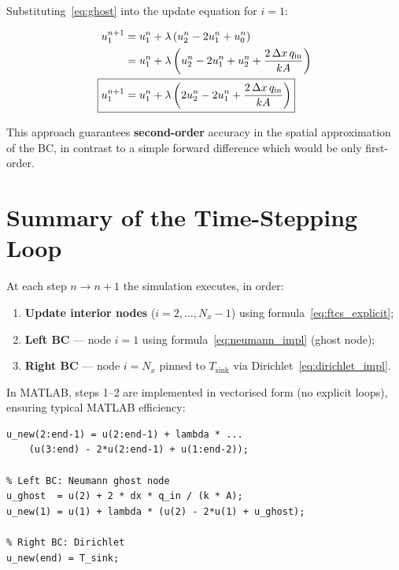 \documentclass[11pt, a4paper]{scrartcl}
\begin{document}
\begin{onehalfspace}
Substituting~\eqref{eq:ghost} into the update equation for $i=1$:

\begin{align}
  u_1^{n+1} &= u_1^n + \lambda \left( u_2^n - 2u_1^n + u_0^n \right) \notag\\
             &= u_1^n + \lambda \left( u_2^n - 2u_1^n + u_2^n + \frac{2\,\Delta x\, q_\text{in}}{k A} \right) \notag\\
  \Aboxed{u_1^{n+1} &= u_1^n + \lambda \left( 2u_2^n - 2u_1^n + \frac{2\,\Delta x\, q_\text{in}}{k A} \right)}
  \label{eq:neumann_impl}
\end{align}

This approach guarantees \textbf{second-order} accuracy in the spatial approximation of the BC, in contrast to a simple forward difference which would be only first-order.

\section{Summary of the Time-Stepping Loop}

At each step $n \to n+1$ the simulation executes, in order:

\begin{enumerate}
  \item \textbf{Update interior nodes} ($i = 2, \ldots, N_x-1$) using formula~\eqref{eq:ftcs_explicit};
  \item \textbf{Left BC} — node $i=1$ using formula~\eqref{eq:neumann_impl} (ghost node);
  \item \textbf{Right BC} — node $i=N_x$ pinned to $T_\text{sink}$ via Dirichlet~\eqref{eq:dirichlet_impl}.
\end{enumerate}

In MATLAB, steps 1--2 are implemented in vectorised form (no explicit loops), ensuring typical MATLAB efficiency:

\begin{lstlisting}[style=matlab, caption={Time-stepping loop kernel in MATLAB}]
% Interior nodes (FTCS)
u_new(2:end-1) = u(2:end-1) + lambda * ...
    (u(3:end) - 2*u(2:end-1) + u(1:end-2));

% Left BC: Neumann ghost node
u_ghost  = u(2) + 2 * dx * q_in / (k * A);
u_new(1) = u(1) + lambda * (u(2) - 2*u(1) + u_ghost);

% Right BC: Dirichlet
u_new(end) = T_sink;
\end{lstlisting}


\end{onehalfspace}
\end{document}
